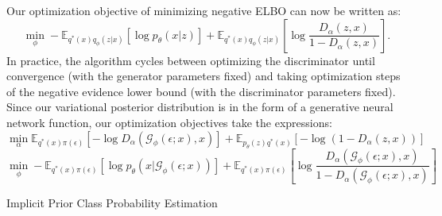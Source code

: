 \documentclass[a4paper,12pt]{article}
\numberwithin{equation}{section}
\begin{document}
Our optimization objective of minimizing negative ELBO can now be written as:
\[\min_\phi -\mathbb{E}_{q^*(x)q_\phi(z|x)}[\log p_\theta (x|z)]+\mathbb{E}_{q^*(x)q_\phi(z|x)}\left[\log \frac{D_\alpha(z,x)}{1-D_\alpha(z,x)}\right].\]
In practice, the algorithm cycles between optimizing the discriminator until convergence (with the generator parameters fixed) and taking optimization steps of the negative evidence lower bound (with the discriminator parameters fixed).\\
Since our variational posterior distribution is in the form of a generative neural network function, our optimization objectives take the expressions:
\[\min_\alpha \mathbb{E}_{q^*(x)\pi(\epsilon)}[-\log D_\alpha(\mathcal{G}_\phi(\epsilon;x),x)]+\mathbb{E}_{p_\theta(z)q^*(x)}[-\log (1-D_\alpha(z,x))]\]
\[\min_\phi -\mathbb{E}_{q^*(x)\pi (\epsilon)}[\log p_\theta (x|\mathcal{G}_\phi(\epsilon;x))]+\mathbb{E}_{q^*(x)\pi(\epsilon)}\left[\log \frac{D_\alpha(\mathcal{G}_\phi(\epsilon;x),x)}{1-D_\alpha(\mathcal{G}_\phi(\epsilon;x),x)}\right]\]
\newpage
\begin{algorithm}
\caption{Implicit Prior Class Probability Estimation}
\BlankLine
{}
\end{algorithm}
\newpage
\end{document}
